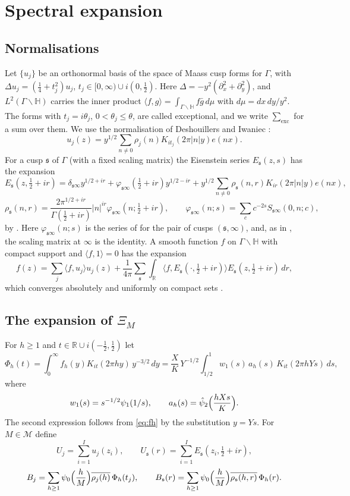 \documentclass[11pt]{amsart}
\theoremstyle{remark}
\theoremstyle{definition}
\numberwithin{equation}{section}
\newcommand{\Mset}{\mathcal{M}}
\newcommand{\R}{\mathbb{R}}
\newcommand{\Hb}{\mathbb{H}}
\newcommand{\gs}{\mathfrak{s}}
\newcommand{\br}[1]{\langle #1\rangle}
\newcommand{\exc}{\mathrm{exc}}
\begin{document}
\section{Spectral expansion}\label{sec:spectral}

\subsection{Normalisations}
Let $\{u_j\}$ be an orthonormal basis of the space of Maass cusp forms for $\Gamma$, with $\Delta u_j=(\frac14+t_j^2)u_j$, $t_j\in[0,\infty)\cup i(0,\frac12)$. Here $\Delta=-y^2(\partial_x^2+\partial_y^2)$, and $L^2(\Gamma\backslash\Hb)$ carries the inner product $\br{f,g}=\int_{\Gamma\backslash\Hb}f\bar g\,d\mu$ with $d\mu=dx\,dy/y^2$. The forms with $t_j=i\theta_j$, $0<\theta_j\le\theta$, are called exceptional, and we write $\sum_{\exc}$ for a sum over them. We use the normalisation of Deshouillers and Iwaniec \cite[(3.15)]{Pas}:
\[
u_j(z)=y^{1/2}\sum_{n\ne0}\rho_j(n)K_{it_j}(2\pi|n|y)e(nx).
\]
For a cusp $\gs$ of $\Gamma$ (with a fixed scaling matrix) the Eisenstein series $E_\gs(z,s)$ has the expansion
\[
E_\gs(z,\tfrac12+ir)=\delta_{\gs\infty}y^{1/2+ir}+\varphi_{\gs\infty}(\tfrac12+ir)y^{1/2-ir}+y^{1/2}\sum_{n\ne0}\rho_\gs(n,r)K_{ir}(2\pi|n|y)e(nx),
\]
\[
\rho_\gs(n,r)=\frac{2\pi^{1/2+ir}}{\Gamma(\frac12+ir)}|n|^{ir}\varphi_{\gs\infty}(n;\tfrac12+ir),\qquad\varphi_{\gs\infty}(n;s)=\sum_{c}c^{-2s}S_{\gs\infty}(0,n;c),
\]
by \cite[Theorem~3.4]{Iw}. Here $\varphi_{\gs\infty}(n;s)$ is the series of \cite[(3.16)]{Pas} for the pair of cusps $(\gs,\infty)$, and, as in \cite[(3.9)]{Pas}, the scaling matrix at $\infty$ is the identity. A smooth function $f$ on $\Gamma\backslash\Hb$ with compact support and $\br{f,1}=0$ has the expansion
\begin{equation}\label{eq:expansion}
f(z)=\sum_j\br{f,u_j}u_j(z)+\frac1{4\pi}\sum_\gs\int_\R\br{f,E_\gs(\cdot,\tfrac12+ir)}E_\gs(z,\tfrac12+ir)\,dr,
\end{equation}
which converges absolutely and uniformly on compact sets \cite[Theorem~7.3]{Iw}.

\subsection{The expansion of \texorpdfstring{$\Xi_M$}{Xi\_M}}
For $h\ge1$ and $t\in\R\cup i(-\frac12,\frac12)$ let
\begin{equation}\label{eq:Phi}
\Phi_h(t)=\int_0^\infty f_h(y)K_{it}(2\pi hy)\,y^{-3/2}\,dy=\frac XK\,Y^{-1/2}\int_{1/2}^1w_1(s)\,a_h(s)\,K_{it}(2\pi hYs)\,ds,
\end{equation}
where
\[
w_1(s)=s^{-1/2}\psi_1(1/s),\qquad a_h(s)=\hat\psi_2\Bigl(\frac{hXs}K\Bigr).
\]
The second expression follows from \eqref{eq:fh} by the substitution $y=Ys$. For $M\in\Mset$ define
\[
U_j=\sum_{i=1}^Iu_j(z_i),\qquad U_\gs(r)=\sum_{i=1}^IE_\gs(z_i,\tfrac12+ir),
\]
\[
B_j=\sum_{h\ge1}\psi_0\Bigl(\frac hM\Bigr)\overline{\rho_j(h)}\,\Phi_h(t_j),\qquad B_\gs(r)=\sum_{h\ge1}\psi_0\Bigl(\frac hM\Bigr)\overline{\rho_\gs(h,r)}\,\Phi_h(r).
\]
\end{document}
